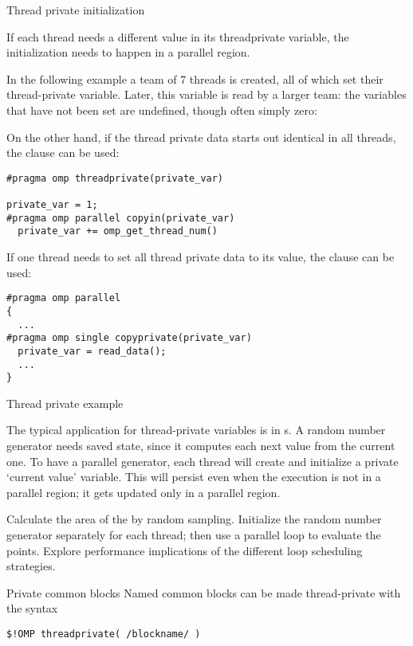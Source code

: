  {Thread private initialization}

If each thread needs a different value in its threadprivate variable,
the initialization needs to happen in a parallel region.

In the following example a team of 7 threads is created, all of which
set their thread-private variable. Later, this variable is read by a
larger team: the variables that have not been set are undefined,
though often simply zero:
%

On the other hand, if the thread private data starts out identical in
all threads, the  clause can be used:
\begin{lstlisting}
#pragma omp threadprivate(private_var)

private_var = 1;
#pragma omp parallel copyin(private_var)
  private_var += omp_get_thread_num()
\end{lstlisting}

If one thread needs to set all thread private data to its value, the
 clause can be used:
\begin{lstlisting}
#pragma omp parallel
{
  ...
#pragma omp single copyprivate(private_var)
  private_var = read_data();
  ...
}
\end{lstlisting}

 {Thread private example}

The typical application for thread-private variables is in
s.
A random number generator needs saved state, since it computes each next value
from the current one. To have a parallel generator, each thread will create
and initialize a private `current value' variable. This will persist
even when the execution is not in a parallel region; it gets updated only
in a parallel region.

\begin{exercise}
  \label{ex:random-mandel}
  Calculate the area of the  by random
  sampling. Initialize the random number generator separately for each
  thread; then use a parallel loop to evaluate the points.
  Explore performance implications of the different loop scheduling strategies.
\end{exercise}

\begin{fortrannote}{Private common blocks}
  Named common blocks can be made thread-private with the syntax
\begin{lstlisting}
$!OMP threadprivate( /blockname/ )
\end{lstlisting}
\end{fortrannote}

